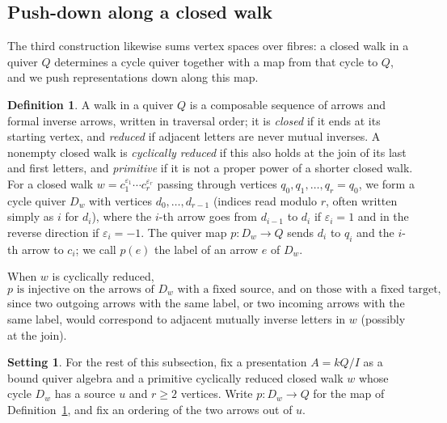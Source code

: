 \documentclass[a4paper,reqno,10pt]{amsart}
\theoremstyle{definition}
\newtheorem{definition}[theorem]{Definition}
\newtheorem{setting}[theorem]{Setting}
\numberwithin{equation}{section}
\begin{document}
\subsection{Push-down along a closed walk}
\label{sec:walks}
The third construction likewise sums vertex spaces over fibres: a closed walk in
a quiver $Q$ determines a cycle quiver together with a map from that cycle to $Q$, and
we push representations down along this map.

\begin{definition}\label{def:walk}
A walk in a quiver $Q$ is a composable sequence of arrows and formal inverse arrows,
written in traversal order; it is \emph{closed} if it ends at its
starting vertex, and \emph{reduced} if adjacent letters are
never mutual inverses. A nonempty closed walk is \emph{cyclically reduced}
if this also holds at the join of its last and first letters, and
\emph{primitive} if it is not a proper power of a shorter closed walk.
For a closed walk
$w=c_1^{\varepsilon_1}\cdots c_r^{\varepsilon_r}$ passing through vertices
$q_0,q_1,\ldots,q_r=q_0$, we form a cycle quiver $D_w$ with vertices
$d_0,\ldots,d_{r-1}$ (indices read modulo $r$, often written simply as $i$ for $d_i$), where the $i$-th arrow goes from $d_{i-1}$ to $d_i$ if $\varepsilon_i=1$
and in the reverse direction if $\varepsilon_i=-1$. The quiver map $p:D_w\to Q$ sends
$d_i$ to $q_i$ and the $i$-th arrow to $c_i$; we call $p(e)$ the label
of an arrow $e$ of $D_w$.
\end{definition}

When $w$ is cyclically reduced,
\begin{equation}\label{eq:local-injectivity}
 p\text{ is injective on the arrows of $D_w$ with a fixed source, and on
 those with a fixed target,}
\end{equation}
since two outgoing arrows with the same label, or two incoming arrows
with the same label, would correspond to adjacent mutually inverse letters in $w$
(possibly at the join).

\begin{setting}\label{set:walk}
For the rest of this subsection, fix a presentation $A=kQ/I$ as a bound
quiver algebra and a primitive cyclically reduced closed walk $w$ whose
cycle $D_w$ has a source $u$ and $r\ge2$ vertices. Write $p:D_w\to Q$
for the map of Definition~\ref{def:walk}, and fix an ordering of the two
arrows out of $u$.
\end{setting}
\end{document}
